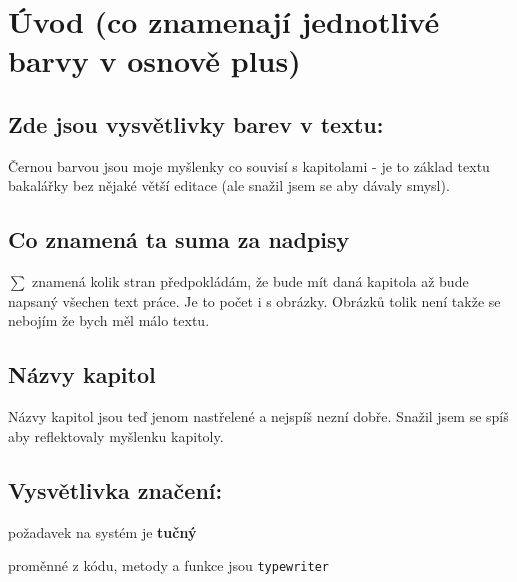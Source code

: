 \chapter*{Úvod (co znamenají jednotlivé barvy v osnově plus)}\label{chap:uvod}

\section*{Zde jsou vysvětlivky barev v textu:}




Černou barvou jsou moje myšlenky co souvisí s kapitolami - je to základ textu bakalářky bez nějaké větší editace (ale snažil jsem se aby dávaly smysl).

\section*{Co znamená ta suma za nadpisy}
$\sum$ znamená kolik stran předpokládám, že bude mít daná kapitola až bude napsaný všechen text práce. Je to počet i s obrázky. Obrázků tolik není takže se nebojím že bych měl málo textu.

\section*{Názvy kapitol}
Názvy kapitol jsou teď jenom nastřelené a nejspíš nezní dobře. Snažil jsem se spíš aby reflektovaly myšlenku kapitoly.

\section*{Vysvětlivka značení:}

požadavek na systém je \textbf{tučný}

proměnné z kódu, metody a funkce jsou \texttt{typewriter}
